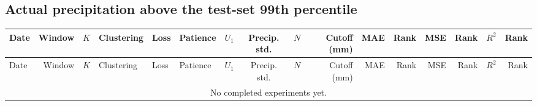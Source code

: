 \documentclass[10pt]{article}
\begin{document}
\begin{landscape}
\subsection*{Actual precipitation above the test-set 99th percentile}
\footnotesize
\setlength{\tabcolsep}{3pt}
\begin{longtable}{@{}lrrlllrcrrrrrrrr@{}}
\toprule
Date & Window & $K$ & Clustering & Loss & Patience & $U_1$ & Precip. std. & $N$ & Cutoff (mm) & MAE & Rank & MSE & Rank & $R^2$ & Rank \\
\midrule
\endfirsthead
\toprule
Date & Window & $K$ & Clustering & Loss & Patience & $U_1$ & Precip. std. & $N$ & Cutoff (mm) & MAE & Rank & MSE & Rank & $R^2$ & Rank \\
\midrule
\endhead
\multicolumn{16}{c}{No completed experiments yet.} \\
\bottomrule
\end{longtable}
\clearpage
\end{landscape}
\end{document}
